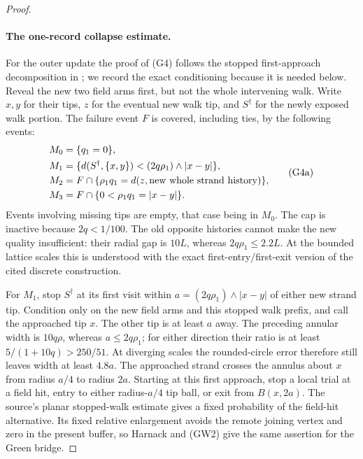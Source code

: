 \begin{proof}
\paragraph{The one-record collapse estimate.}
For the outer update the proof of (G4) follows the stopped first-approach
decomposition in \cite[proof of (3.38)]{SSdiscrete}; we record the exact
conditioning because it is needed below.  Reveal the new two field arms
first, but not the whole intervening walk.  Write \(x,y\) for their tips,
\(z\) for the eventual new walk tip, and \(S^\dagger\) for the newly
exposed walk portion.  The failure event \(F\) is covered, including ties,
by the following events:
\[
\begin{split}
 M_0&=\{q_1=0\},\\
 M_1&=\{d(S^\dagger,\{x,y\})<(2q\rho_1)\wedge|x-y|\},\\
 M_2&=F\cap\{\rho_1q_1=d(z,\hbox{new whole strand history})\},\\
 M_3&=F\cap\{0<\rho_1q_1=|x-y|\}.
\end{split}                                                   \tag{G4a}
\]
Events involving missing tips are empty, that case being in \(M_0\).
The cap is inactive because \(2q<1/100\).  The old opposite histories
cannot make the new quality insufficient: their radial gap is \(10L\),
whereas \(2q\rho_1\le2.2L\).  At the bounded lattice scales this is
understood with the exact first-entry/first-exit version of the cited
discrete construction.

For \(M_1\), stop \(S^\dagger\) at its first visit within
\(a=(2q\rho_1)\wedge|x-y|\) of either new strand tip.  Condition only
on the new field arms and this stopped walk prefix, and call the approached
tip \(x\).  The other tip is at least \(a\) away.  The preceding annular
width is \(10q\rho\), whereas \(a\le2q\rho_1\); for either direction
their ratio is at least \(5/(1+10q)>250/51\).  At diverging scales the
rounded-circle error therefore still leaves width at least \(4.8a\).
The approached strand crosses the annulus about \(x\) from radius
\(a/4\) to radius \(2a\).  Starting at this first approach, stop a local
trial at a field hit, entry to either radius-\(a/4\) tip ball, or exit
from \(B(x,2a)\).  The source's planar stopped-walk estimate gives a
fixed probability of the field-hit alternative.  Its fixed relative
enlargement avoids the remote joining vertex and zero in the present
buffer, so Harnack and (GW2) give the same assertion for the Green bridge.


\end{proof}
